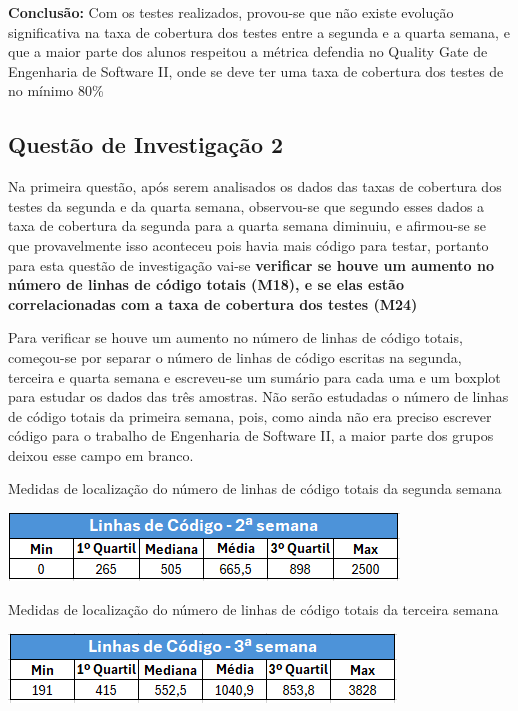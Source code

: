 \documentclass[%
 aip,
cp,  %
 amsmath,amssymb,%
 reprint,%
]{revtex4-2}
\begin{document}
\vspace{1cm}

\textbf{Conclusão:} Com os testes realizados, provou-se que  não existe evolução significativa na taxa de cobertura dos testes entre a segunda e a quarta semana, e que a maior parte dos alunos respeitou a métrica defendia no Quality Gate de Engenharia de Software II, onde se deve ter uma taxa de cobertura dos testes de no mínimo 80\%

\newpage




\subsection{Questão de Investigação 2}
Na primeira questão, após serem analisados os dados das taxas de cobertura dos testes da segunda e da quarta semana, observou-se que segundo esses dados a taxa de cobertura da segunda para a quarta semana diminuiu, e afirmou-se se que provavelmente isso aconteceu pois havia mais código para testar, portanto para esta questão de investigação vai-se \textbf{verificar se houve um aumento no número de linhas de código totais (M18), e se elas estão correlacionadas com a taxa de cobertura dos testes (M24)}

Para verificar se houve um aumento no número de linhas de código totais, começou-se por separar o número de linhas de código escritas na segunda, terceira e quarta semana e escreveu-se um sumário para cada uma e um boxplot para estudar os dados das três amostras. Não serão estudadas o número de linhas de código totais da primeira semana, pois, como ainda não era preciso escrever código para o trabalho de Engenharia de Software II, a maior parte dos grupos deixou esse campo em branco.

\begin{table}[!h]
    \centering
    \caption{Medidas de localização do número de linhas de código totais da segunda semana}
    \label{fig:sumarryLinhasSemana2}
    \includegraphics[width=0.5\linewidth]{imagens//questao2/sumarryLinhasSemana2.png}
    \label{fig:sumarryLinhasSemana2}
\end{table}

\begin{table}[!h]
    \centering
    \caption{Medidas de localização do número de linhas de código totais da terceira semana}
    \label{fig:sumarryLinhasSemana3}
    \includegraphics[width=0.5\linewidth]{imagens//questao2/sumarryLinhasSemana3.png}
    \label{fig:sumarryLinhasSemana3}
\end{table}
\end{document}
